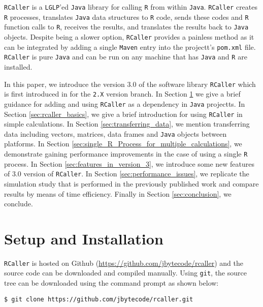 \documentclass[10pt,a4paper, final, oneside]{article}
\begin{document}
\texttt{RCaller} \cite{satman2014rcaller} is a \texttt{LGLP}'ed \texttt{Java} library for calling \texttt{R} from within \texttt{Java}. \texttt{RCaller} creates \texttt{R} processes, translates \texttt{Java} data structures to \texttt{R} code, sends these codes and \texttt{R} function calls to \texttt{R}, receives the results, and translates the results back to \texttt{Java} objects. Despite being a slower option, \texttt{RCaller} provides a painless method as it can be integrated by adding a single \texttt{Maven} entry into the projectt's \texttt{pom.xml} file. \texttt{RCaller} is pure \texttt{Java} and can be run on any machine that has \texttt{Java} and \texttt{R} are installed. 

In this paper, we introduce the version $3.0$ of the software library \texttt{RCaller} which is first introduced in \cite{satman2014rcaller} for the \texttt{2.X} version branch. In Section \ref{sec:setup} we give a brief guidance for adding and using \texttt{RCaller} as a dependency in \texttt{Java} projectts. In Section \ref{sec:rcaller_basics}, we give a brief introduction for using \texttt{RCaller} in simple calculations. In Section \ref{sec:transferring_data}, we mention transferring data including vectors, matrices, data frames and \texttt{Java} objects between platforms. In Section \ref{sec:single_R_Process_for_multiple_calculations}, we demonstrate gaining performance improvements in the case of using a single \texttt{R} process. In Section \ref{sec:features_in_version_3}, we introduce some new features of $3.0$ version of \texttt{RCaller}. In Section \ref{sec:performance_issues}, we replicate the simulation study that is performed in the previously published work and compare results by means of time efficiency. Finally in Section \ref{sec:conclusion}, we conclude.

\section{Setup and Installation}
\label{sec:setup}

\texttt{RCaller} is hosted on Github (\url{https://github.com/jbytecode/rcaller}) and the source code can be downloaded and compiled manually. Using \texttt{git}, the source tree can be downloaded using the command prompt as shown below:


\begin{minipage}{\linewidth}
\begin{lstlisting}[caption=Downloading source code, label=code:git]
$ git clone https://github.com/jbytecode/rcaller.git
\end{lstlisting}
\end{minipage}
\end{document}
